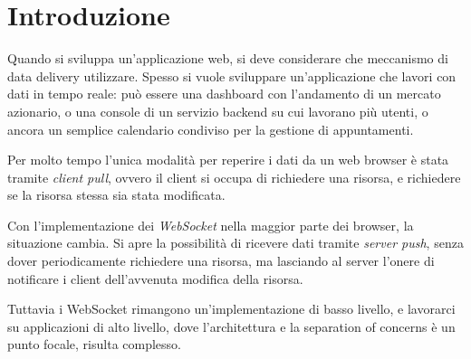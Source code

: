 \documentclass[12pt,a4paper,openright,twoside]{report}
\begin{document}
\cleardoublepage
\linespread{1.3}


\normalsize
\clearpage{\pagestyle{empty}\cleardoublepage}
\tableofcontents

\listoffigures
{}


\chapter*{Introduzione}
Quando si sviluppa un’applicazione web, si deve considerare che meccanismo di data delivery utilizzare. Spesso si vuole sviluppare un’applicazione che lavori con dati in tempo reale: può essere una dashboard con l’andamento di un mercato azionario, o una console di un servizio backend su cui lavorano più utenti, o ancora un semplice calendario condiviso per la gestione di appuntamenti.

\bigskip

Per molto tempo l’unica modalità per reperire i dati da un web browser è stata tramite \textit{client pull}, ovvero il client si occupa di richiedere una risorsa, e richiedere se la risorsa stessa sia stata modificata.

\bigskip

Con l’implementazione dei \textit{WebSocket} nella maggior parte dei browser, la situazione cambia. Si apre la possibilità di ricevere dati tramite \textit{server push}, senza dover periodicamente richiedere una risorsa, ma lasciando al server l’onere di notificare i client dell’avvenuta modifica della risorsa.

\bigskip

Tuttavia i WebSocket rimangono un’implementazione di basso livello, e lavorarci su applicazioni di alto livello, dove l’architettura e la separation of concerns è un punto focale, risulta complesso.
\end{document}
